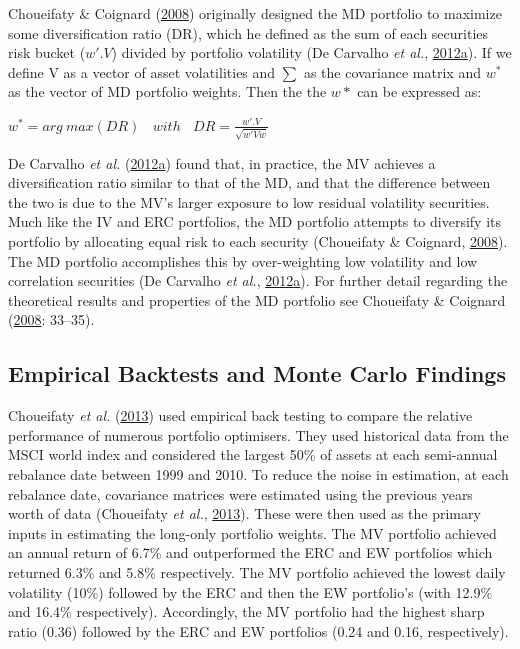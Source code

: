 \documentclass[11pt,preprint, authoryear]{elsarticle}
\numberwithin{equation}{section}
\numberwithin{figure}{section}
\numberwithin{table}{section}
\begin{document}
Choueifaty \& Coignard (\protect\hyperlink{ref-choueifaty2008}{2008})
originally designed the MD portfolio to maximize some diversification
ratio (DR), which he defined as the sum of each securities risk bucket
(\(w'.V\)) divided by portfolio volatility (De Carvalho \emph{et al.},
\protect\hyperlink{ref-leote}{2012}\protect\hyperlink{ref-leote}{a}). If
we define V as a vector of asset volatilities and \(\sum\) as the
covariance matrix and \(w^*\) as the vector of MD portfolio weights.
Then the the \(w*\) can be expressed as:

\begin{center} 
$w^* =arg\ max(DR)\ \ \ \ with \ \ \ \  DR= \frac{w'.V}{\sqrt{w'Vw}}$ 
\end{center}

De Carvalho \emph{et al.}
(\protect\hyperlink{ref-leote}{2012}\protect\hyperlink{ref-leote}{a})
found that, in practice, the MV achieves a diversification ratio similar
to that of the MD, and that the difference between the two is due to the
MV's larger exposure to low residual volatility securities. Much like
the IV and ERC portfolios, the MD portfolio attempts to diversify its
portfolio by allocating equal risk to each security (Choueifaty \&
Coignard, \protect\hyperlink{ref-choueifaty2008}{2008}). The MD
portfolio accomplishes this by over-weighting low volatility and low
correlation securities (De Carvalho \emph{et al.},
\protect\hyperlink{ref-leote}{2012}\protect\hyperlink{ref-leote}{a}).
For further detail regarding the theoretical results and properties of
the MD portfolio see Choueifaty \& Coignard
(\protect\hyperlink{ref-choueifaty2008}{2008}: 33--35).

\hypertarget{empirical-backtests-and-monte-carlo-findings}{%
\subsection{Empirical Backtests and Monte Carlo
Findings}\label{empirical-backtests-and-monte-carlo-findings}}

Choueifaty \emph{et al.} (\protect\hyperlink{ref-choueifaty2013}{2013})
used empirical back testing to compare the relative performance of
numerous portfolio optimisers. They used historical data from the MSCI
world index and considered the largest 50\% of assets at each
semi-annual rebalance date between 1999 and 2010. To reduce the noise in
estimation, at each rebalance date, covariance matrices were estimated
using the previous years worth of data (Choueifaty \emph{et al.},
\protect\hyperlink{ref-choueifaty2013}{2013}). These were then used as
the primary inputs in estimating the long-only portfolio weights. The MV
portfolio achieved an annual return of 6.7\% and outperformed the ERC
and EW portfolios which returned 6.3\% and 5.8\% respectively. The MV
portfolio achieved the lowest daily volatility (10\%) followed by the
ERC and then the EW portfolio's (with 12.9\% and 16.4\% respectively).
Accordingly, the MV portfolio had the highest sharp ratio (0.36)
followed by the ERC and EW portfolios (0.24 and 0.16, respectively).
\end{document}
